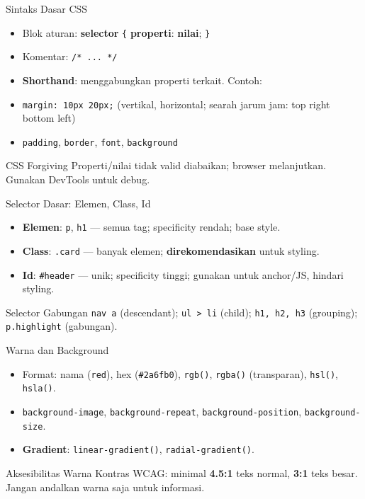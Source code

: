 \documentclass[handout]{beamer}
\begin{document}
\begin{frame}{Sintaks Dasar CSS}
	\begin{itemize}
		\item Blok aturan: \textbf{selector} \texttt{\{} \textbf{properti}: \textbf{nilai}; \texttt{\}}
		\item Komentar: \texttt{/* ... */}
		\item \textbf{Shorthand}: menggabungkan properti terkait. Contoh:
		\item \texttt{margin: 10px 20px;} (vertikal, horizontal; searah jarum jam: top right bottom left)
		\item \texttt{padding}, \texttt{border}, \texttt{font}, \texttt{background}
	\end{itemize}
	\begin{block}{CSS Forgiving}
		Properti/nilai tidak valid diabaikan; browser melanjutkan. Gunakan DevTools untuk debug.
	\end{block}
\end{frame}

\begin{frame}{Selector Dasar: Elemen, Class, Id}
	\begin{itemize}
		\item \textbf{Elemen}: \texttt{p}, \texttt{h1} --- semua tag; specificity rendah; base style.
		\item \textbf{Class}: \texttt{.card} --- banyak elemen; \textbf{direkomendasikan} untuk styling.
		\item \textbf{Id}: \texttt{\#header} --- unik; specificity tinggi; gunakan untuk anchor/JS, hindari styling.
	\end{itemize}
	\begin{block}{Selector Gabungan}
		\texttt{nav a} (descendant); \texttt{ul > li} (child); \texttt{h1, h2, h3} (grouping); \texttt{p.highlight} (gabungan).
	\end{block}
\end{frame}

\begin{frame}{Warna dan Background}
	\begin{itemize}
		\item Format: nama (\texttt{red}), hex (\texttt{\#2a6fb0}), \texttt{rgb()}, \texttt{rgba()} (transparan), \texttt{hsl()}, \texttt{hsla()}.
		\item \texttt{background-image}, \texttt{background-repeat}, \texttt{background-position}, \texttt{background-size}.
		\item \textbf{Gradient}: \texttt{linear-gradient()}, \texttt{radial-gradient()}.
	\end{itemize}
	\begin{block}{Aksesibilitas Warna}
		Kontras WCAG: minimal \textbf{4.5:1} teks normal, \textbf{3:1} teks besar. Jangan andalkan warna saja untuk informasi.
	\end{block}
\end{frame}
\end{document}
